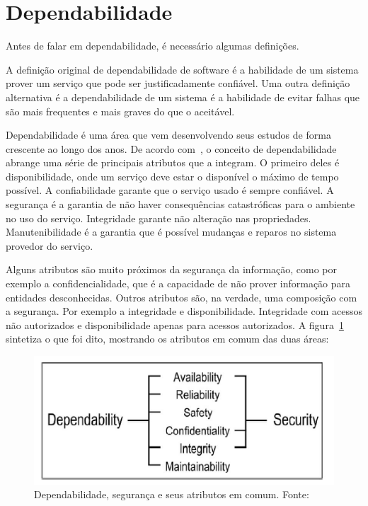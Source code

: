 \section{Dependabilidade}


Antes de falar em dependabilidade, é necessário algumas definições.

A definição original de dependabilidade de software é a habilidade de um sistema prover um serviço que pode ser justificadamente confiável. Uma outra definição alternativa é a dependabilidade de um sistema é a habilidade de evitar falhas que são mais frequentes e mais graves do que o aceitável.

Dependabilidade é uma área que vem desenvolvendo seus estudos de forma crescente ao longo dos anos. De acordo com~\cite{algirdas04}, o conceito de dependabilidade abrange uma série de principais atributos que a integram. O primeiro deles é disponibilidade, onde um serviço deve estar o disponível o máximo de tempo possível. A confiabilidade garante que o serviço usado é sempre confiável. A segurança é a garantia de não haver consequências catastróficas para o ambiente no uso do serviço. Integridade garante não alteração nas propriedades. Manutenibilidade é a garantia que é possível mudanças e reparos no sistema provedor do serviço.

Alguns atributos são muito próximos da segurança da informação, como por exemplo a confidencialidade, que é a capacidade de não prover informação para entidades desconhecidas. Outros atributos são, na verdade, uma composição com a segurança. Por exemplo a integridade e disponibilidade. Integridade com acessos não autorizados e disponibilidade apenas para acessos autorizados. A figura~\ref{fig:dependabilidade-seguranca} sintetiza o que foi dito, mostrando os atributos em comum das duas áreas:

\begin{figure}
	\centering
	\includegraphics[scale=0.75]{images/dependabilidade-seguranca.png}
	\caption{Dependabilidade, segurança e seus atributos em comum. Fonte:~\cite{algirdas04}}
	\label{fig:dependabilidade-seguranca}
\end{figure}

